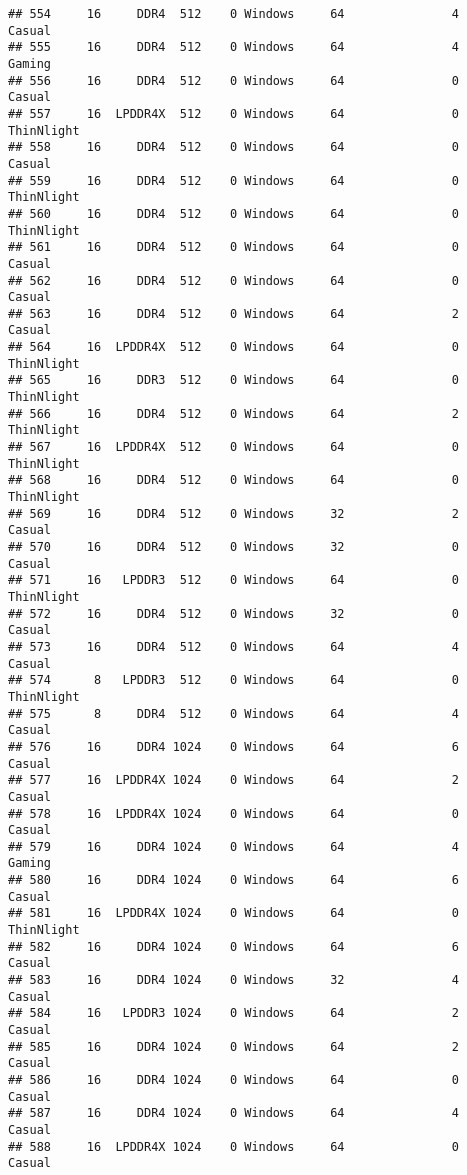 \documentclass[
]{article}
\begin{document}
\begin{verbatim}
## 554     16     DDR4  512    0 Windows     64               4     Casual
## 555     16     DDR4  512    0 Windows     64               4     Gaming
## 556     16     DDR4  512    0 Windows     64               0     Casual
## 557     16  LPDDR4X  512    0 Windows     64               0 ThinNlight
## 558     16     DDR4  512    0 Windows     64               0     Casual
## 559     16     DDR4  512    0 Windows     64               0 ThinNlight
## 560     16     DDR4  512    0 Windows     64               0 ThinNlight
## 561     16     DDR4  512    0 Windows     64               0     Casual
## 562     16     DDR4  512    0 Windows     64               0     Casual
## 563     16     DDR4  512    0 Windows     64               2     Casual
## 564     16  LPDDR4X  512    0 Windows     64               0 ThinNlight
## 565     16     DDR3  512    0 Windows     64               0 ThinNlight
## 566     16     DDR4  512    0 Windows     64               2 ThinNlight
## 567     16  LPDDR4X  512    0 Windows     64               0 ThinNlight
## 568     16     DDR4  512    0 Windows     64               0 ThinNlight
## 569     16     DDR4  512    0 Windows     32               2     Casual
## 570     16     DDR4  512    0 Windows     32               0     Casual
## 571     16   LPDDR3  512    0 Windows     64               0 ThinNlight
## 572     16     DDR4  512    0 Windows     32               0     Casual
## 573     16     DDR4  512    0 Windows     64               4     Casual
## 574      8   LPDDR3  512    0 Windows     64               0 ThinNlight
## 575      8     DDR4  512    0 Windows     64               4     Casual
## 576     16     DDR4 1024    0 Windows     64               6     Casual
## 577     16  LPDDR4X 1024    0 Windows     64               2     Casual
## 578     16  LPDDR4X 1024    0 Windows     64               0     Casual
## 579     16     DDR4 1024    0 Windows     64               4     Gaming
## 580     16     DDR4 1024    0 Windows     64               6     Casual
## 581     16  LPDDR4X 1024    0 Windows     64               0 ThinNlight
## 582     16     DDR4 1024    0 Windows     64               6     Casual
## 583     16     DDR4 1024    0 Windows     32               4     Casual
## 584     16   LPDDR3 1024    0 Windows     64               2     Casual
## 585     16     DDR4 1024    0 Windows     64               2     Casual
## 586     16     DDR4 1024    0 Windows     64               0     Casual
## 587     16     DDR4 1024    0 Windows     64               4     Casual
## 588     16  LPDDR4X 1024    0 Windows     64               0     Casual

\end{verbatim}
\end{document}
